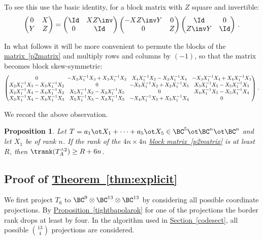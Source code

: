 \documentclass[11pt]{article}
\newcommand{\expref}[2]{\texorpdfstring{\hyperref[#2]{#1~\ref{#2}}}{#1~\ref{#2}}}
\newcommand{\expeqref}[2]{\texorpdfstring{\hyperref[#2]{#1~\eqref{#2}}}{#1~\eqref{#2}}}
\newtheorem{proposition}[theorem]{Proposition}
\begin{document}
To see this use the basic identity, for a block matrix with 
$Z$ square and invertible: 
$$
\begin{pmatrix}
0&X\\ Y&Z\end{pmatrix}
=
\begin{pmatrix} 
\Id & XZ\inv \\ 0 &\Id\end{pmatrix}
\begin{pmatrix}
-XZ\inv Y & 0 \\ 0&Z\end{pmatrix} 
\begin{pmatrix} \Id & 0\\
Z\inv Y & \Id
\end{pmatrix}\,.
$$

\newcommand{\qw}{\hspace{-0.45em}}    %
%
In what follows it will be more convenient to permute the blocks of
the \expeqref{matrix}{p2matrix}  %
and multiply rows and columns by $(-1)$, so that the matrix becomes block skew-symmetric:
\begin{equation}\label{p2matrixb}
\begin{pmatrix}
0&\qw 
-X_2X_1^{-1} X_3+X_3X_1^{-1}X_2 
&\qw  X_4X_1^{-1} X_2-X_2X_1^{-1}X_4&\qw 
-X_3X_1^{-1} X_4+X_4X_1^{-1}X_3
\\
X_2X_1^{-1} X_3-X_3X_1^{-1}X_2
&\qw 0&\qw -X_5X_1^{-1} X_2+X_2X_1^{-1}X_5&\qw 
X_3X_1^{-1} X_5-X_5X_1^{-1}X_3
\\
X_2X_1^{-1} X_4-X_4X_1^{-1}X_2
&\qw X_5X_1^{-1} X_2-X_2X_1^{-1}X_5
&\qw 0&\qw X_4X_1^{-1} X_5-X_5X_1^{-1}X_4
\\
X_3X_1^{-1} X_4-X_4X_1^{-1}X_3
&\qw X_5X_1^{-1} X_3-X_3X_1^{-1}X_5
&\qw -X_4X_1^{-1} X_5+X_5X_1^{-1}X_4&\qw 
0
\end{pmatrix}\,.
\end{equation}

We record the above observation. %

\begin{proposition}\label{blockred} Let $T=a_1\ot X_1+\cdots + a_5\ot X_5\in \BC^5\ot \BC^n\ot \BC^n$ and let $X_1$ be
of   rank $n$.
If   the rank of the $4n\times 4n$ \expeqref{block matrix}{p2matrix}
is at least 
$R$, then $\trank(T_{A}^{\wedge 2})\geq R+6n$.
\end{proposition}

\subsection{Proof of \expref{Theorem}{thm:explicit}}
We first project $T_6$ to $\BC^9\otimes \BC^{13}\otimes \BC^{13}$ by considering all possible coordinate projections. By \expref{Proposition}{tightbapolarok} for one of the projections the border rank drops at least by four.
In the algorithm
used  in %
\expref{Section}{codesect},  %
all possible $\binom{13}{4}$ projections are considered. 
\end{document}
